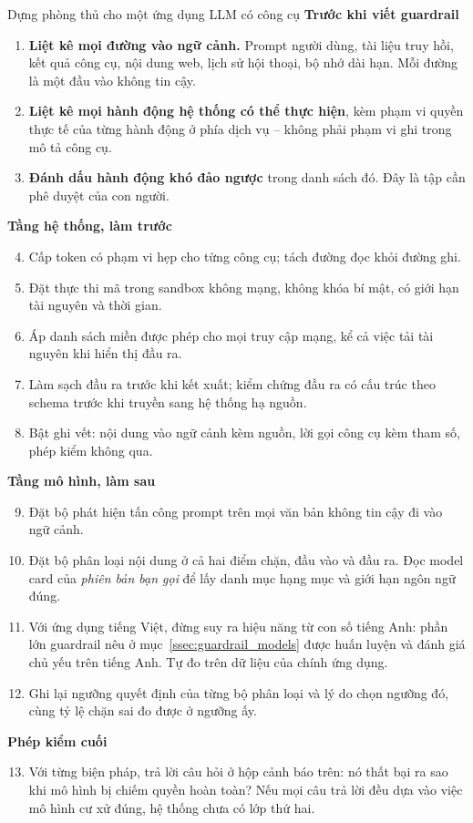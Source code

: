 \begin{checklist}{Dựng phòng thủ cho một ứng dụng LLM có công cụ}
\textbf{Trước khi viết guardrail}
\begin{enumerate}
	\item \textbf{Liệt kê mọi đường vào ngữ cảnh.} Prompt người dùng, tài liệu truy hồi, kết quả công cụ, nội dung web, lịch sử hội thoại, bộ nhớ dài hạn. Mỗi đường là một đầu vào không tin cậy.
	\item \textbf{Liệt kê mọi hành động hệ thống có thể thực hiện}, kèm phạm vi quyền thực tế của từng hành động ở phía dịch vụ -- không phải phạm vi ghi trong mô tả công cụ.
	\item \textbf{Đánh dấu hành động khó đảo ngược} trong danh sách đó. Đây là tập cần phê duyệt của con người.
\end{enumerate}
\textbf{Tầng hệ thống, làm trước}
\begin{enumerate}\setcounter{enumi}{3}
	\item Cấp token có phạm vi hẹp cho từng công cụ; tách đường đọc khỏi đường ghi.
	\item Đặt thực thi mã trong sandbox không mạng, không khóa bí mật, có giới hạn tài nguyên và thời gian.
	\item Áp danh sách miền được phép cho mọi truy cập mạng, kể cả việc tải tài nguyên khi hiển thị đầu ra.
	\item Làm sạch đầu ra trước khi kết xuất; kiểm chứng đầu ra có cấu trúc theo schema trước khi truyền sang hệ thống hạ nguồn.
	\item Bật ghi vết: nội dung vào ngữ cảnh kèm nguồn, lời gọi công cụ kèm tham số, phép kiểm không qua.
\end{enumerate}
\textbf{Tầng mô hình, làm sau}
\begin{enumerate}\setcounter{enumi}{8}
	\item Đặt bộ phát hiện tấn công prompt trên mọi văn bản không tin cậy đi vào ngữ cảnh.
	\item Đặt bộ phân loại nội dung ở cả hai điểm chặn, đầu vào và đầu ra. Đọc model card của \emph{phiên bản bạn gọi} để lấy danh mục hạng mục và giới hạn ngôn ngữ đúng.
	\item Với ứng dụng tiếng Việt, đừng suy ra hiệu năng từ con số tiếng Anh: phần lớn guardrail nêu ở mục~\ref{ssec:guardrail_models} được huấn luyện và đánh giá chủ yếu trên tiếng Anh. Tự đo trên dữ liệu của chính ứng dụng.
	\item Ghi lại ngưỡng quyết định của từng bộ phân loại và lý do chọn ngưỡng đó, cùng tỷ lệ chặn sai đo được ở ngưỡng ấy.
\end{enumerate}
\textbf{Phép kiểm cuối}
\begin{enumerate}\setcounter{enumi}{12}
	\item Với từng biện pháp, trả lời câu hỏi ở hộp cảnh báo trên: nó thất bại ra sao khi mô hình bị chiếm quyền hoàn toàn? Nếu mọi câu trả lời đều dựa vào việc mô hình cư xử đúng, hệ thống chưa có lớp thứ hai.
\end{enumerate}
\end{checklist}
